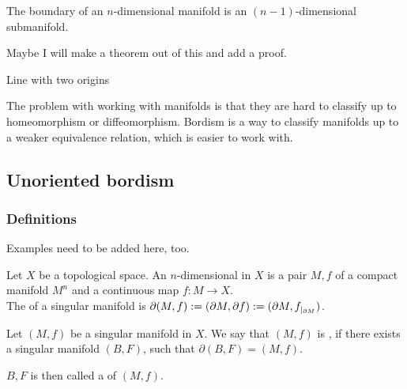 \documentclass[a4paper,11pt]{article}
\begin{document}
\begin{remark}
    The boundary of an \(n\)-dimensional manifold is an \((n-1)\)-dimensional submanifold.
\end{remark}

Maybe I will make a theorem out of this and add a proof.

\begin{nonex}
    Line with two origins
\end{nonex}


The problem with working with manifolds is that they are hard to classify up to homeomorphism or diffeomorphism. Bordism is a way to classify manifolds up to a weaker equivalence relation, which is easier to work with.

\subsection{Unoriented bordism}
\subsubsection{Definitions}
Examples need to be added here, too.

\begin{definition}\label{singular manifold}
    Let \(X\) be a topological space. An \(n\)-dimensional  in \(X\) is a pair \(M,f\) of a compact manifold \(M^n\) and a continuous map \(f:M\to X\).\\
    The  of a singular manifold is \(\partial(M,f):=(\partial M, \partial f):=(\partial M,f_{|_{\partial M}})\).
\end{definition}

\begin{definition}
    Let \((M,f)\) be a singular manifold in \(X\). We say that \((M,f)\) is , if there exists a singular manifold \((B,F)\), such that \(\partial(B,F)=(M,f)\).

    \(B,F\) is then called a  of \((M,f)\).
\end{definition}

\begin{example}
\end{example}
\end{document}
